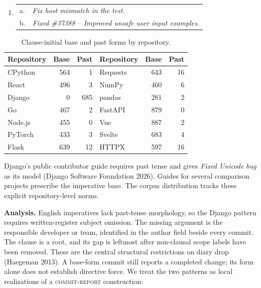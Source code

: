 \documentclass[12pt]{article}
\newcommand{\ex}[1]{\textit{#1}}
\begin{document}
\begin{enumerate}[label=(\arabic*),leftmargin=2.2em,itemsep=0pt,topsep=2pt]
\item \begin{tabular}[t]{@{}ll@{}}
a. & \ex{Fix host mismatch in the test.}\\
b. & \ex{Fixed \#37388 -- Improved unsafe user input examples.}
\end{tabular}
\end{enumerate}
\vspace{-0.4em}

\begin{table}[h]
\centering
\caption{Clause-initial base and past forms by repository.}
\label{tab:repos}
\vspace{-0.35em}
\begin{tabular}{@{}lrr@{\hspace{1.35em}}lrr@{}}
\toprule
Repository & Base & Past & Repository & Base & Past\\
\midrule
CPython  & 564 & 1  & Requests & 643 & 16\\
React    & 496 & 3  & NumPy    & 460 & 6\\
Django   & 0   & 685& pandas   & 281 & 2\\
Go       & 467 & 2  & FastAPI  & 879 & 0\\
Node.js  & 455 & 0  & Vue      & 887 & 2\\
PyTorch  & 433 & 3  & Svelte   & 683 & 4\\
Flask    & 639 & 12 & HTTPX    & 597 & 16\\
\bottomrule
\end{tabular}
\end{table}
\vspace{-0.65em}

\newpage
Django's public contributor guide requires past tense and gives \ex{Fixed
Unicode bug} as its model (Django Software Foundation 2026). Guides for several
comparison projects prescribe the imperative base. The corpus distribution
tracks these explicit repository-level norms.

\textbf{Analysis.}
English imperatives lack past-tense morphology, so the Django pattern requires
written-register subject omission. The missing argument is the responsible
developer or team, identified in the author field beside every commit. The
clause is a root, and its gap is leftmost after non-clausal scope labels have
been removed. These are the central structural restrictions on diary drop
(Haegeman 2013). A base-form commit still reports a completed change; its form
alone does not establish directive force. We treat the two patterns as local
realizations of a \textsc{commit-report} construction:
\end{document}
